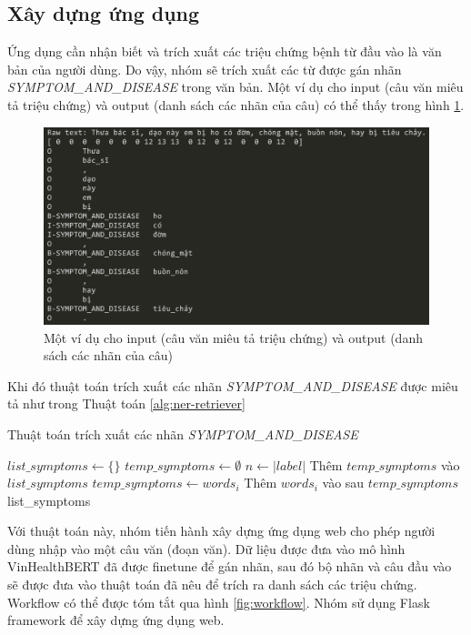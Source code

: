\documentclass[12pt]{article}
\begin{document}
\subsection{Xây dựng ứng dụng}
Ứng dụng cần nhận biết và trích xuất các triệu chứng bệnh từ đầu vào là văn bản của người dùng. Do vậy, nhóm sẽ trích xuất các từ được gán nhãn \textit{SYMPTOM\_AND\_DISEASE} trong văn bản. Một ví dụ cho input (câu văn miêu tả triệu chứng) và output (danh sách các nhãn của câu) có thể thấy trong hình \ref{fig:example-result}.
\begin{figure}
\centering
\includegraphics[scale=.5]{img/example-result.png}
\caption{Một ví dụ cho input (câu văn miêu tả triệu chứng) và output (danh sách các nhãn của câu)}
\label{fig:example-result}
\end{figure}

Khi đó thuật toán trích xuất các nhãn \textit{SYMPTOM\_AND\_DISEASE} được miêu tả như trong Thuật toán \ref{alg:ner-retriever}

\begin{algorithm}
\caption{Thuật toán trích xuất các nhãn \textit{SYMPTOM\_AND\_DISEASE}}
\label{alg:ner-retriever}
\begin{algorithmic}
\State $list\_symptoms \gets \{\}$
\State $temp\_symptoms \gets \emptyset$
\State $n \gets |label|$
    \State Thêm $temp\_symptoms$ vào $list\_symptoms$
    \State $temp\_symptoms \gets words_i$
\EndIf
{}
\State Thêm $words_i$ vào sau $temp\_symptoms$
\EndIf
\EndFor
\State\Return list\_symptoms
\EndFunction
\end{algorithmic}
\end{algorithm}

Với thuật toán này, nhóm tiến hành xây dựng ứng dụng web cho phép người dùng nhập vào một câu văn (đoạn văn). Dữ liệu được đưa vào mô hình VinHealthBERT đã được finetune để gán nhãn, sau đó bộ nhãn và câu đầu vào sẽ được đưa vào thuật toán đã nêu để trích ra danh sách các triệu chứng. Workflow có thể được tóm tắt qua hình \ref{fig:workflow}. Nhóm sử dụng Flask framework để xây dựng ứng dụng web.
\end{document}
